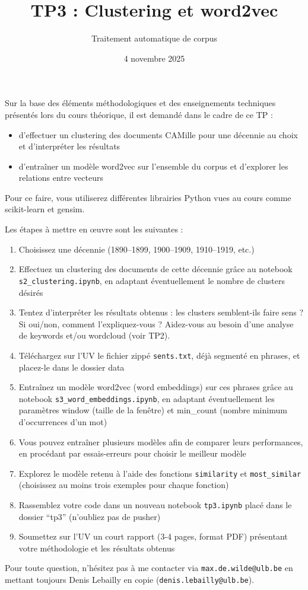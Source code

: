 \documentclass[a4paper,11pt]{article}
\title{TP3 : Clustering et word2vec}
\author{Traitement automatique de corpus}
\date{4 novembre 2025}
\begin{document}
\maketitle
\thispagestyle{empty}

Sur la base des éléments méthodologiques et des enseignements techniques présentés lors du cours théorique, il est demandé dans le cadre de ce TP :

\begin{itemize}
\item d'effectuer un clustering des documents CAMille pour une décennie au choix et d'interpréter les résultats
\item d'entraîner un modèle word2vec sur l'ensemble du corpus et d'explorer les relations entre vecteurs
\end{itemize}

Pour ce faire, vous utiliserez différentes librairies Python vues au cours comme scikit-learn et gensim.

\vspace{0.7cm}

Les étapes à mettre en \oe uvre sont les suivantes :

\begin{enumerate}
\item Choisissez une décennie (1890--1899, 1900--1909, 1910--1919, etc.)
\item Effectuez un clustering des documents de cette décennie grâce au notebook \texttt{s2\_clustering.ipynb}, en adaptant éventuellement le nombre de clusters désirés
\item Tentez d'interpréter les résultats obtenus : les clusters semblent-ils faire sens ? Si oui/non, comment l'expliquez-vous ? Aidez-vous au besoin d'une analyse de keywords et/ou wordcloud (voir TP2).
\item Téléchargez sur l'UV le fichier zippé \texttt{sents.txt}, déjà segmenté en phrases, et placez-le dans le dossier data
\item Entraînez un modèle word2vec (word embeddings) sur ces phrases grâce au notebook \texttt{s3\_word\_embeddings.ipynb}, en adaptant éventuellement les paramètres window (taille de la fenêtre) et min\_count (nombre minimum d'occurrences d'un mot)
\item Vous pouvez entraîner plusieurs modèles afin de comparer leurs performances, en procédant par essais-erreurs pour choisir le meilleur modèle
\item Explorez le modèle retenu à l'aide des fonctions \texttt{similarity} et \texttt{most\_similar} (choisissez au moins trois exemples pour chaque fonction)
\item Rassemblez votre code dans un nouveau notebook \texttt{tp3.ipynb} placé dans le dossier \enquote{tp3} (n'oubliez pas de pusher)
\item Soumettez sur l'UV un court rapport (3-4 pages, format PDF) présentant votre méthodologie et les résultats obtenus
\end{enumerate}

Pour toute question, n'hésitez pas à me contacter via \texttt{max.de.wilde@ulb.be} en mettant toujours Denis Lebailly en copie (\texttt{denis.lebailly@ulb.be}).
\end{document}
